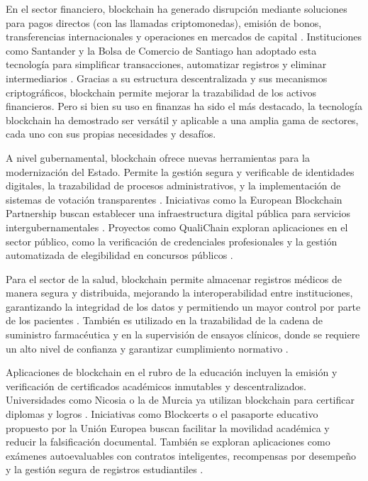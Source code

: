 En el sector financiero, blockchain ha generado disrupción mediante soluciones para pagos directos (con las llamadas criptomonedas), emisión de bonos, transferencias internacionales y operaciones en mercados de capital \cite{bartolomeo2020introduccion}. Instituciones como Santander y la Bolsa de Comercio de Santiago han adoptado esta tecnología para simplificar transacciones, automatizar registros y eliminar intermediarios \cite{bartolomeo2020introduccion}. Gracias a su estructura descentralizada y sus mecanismos criptográficos, blockchain permite mejorar la trazabilidad de los activos financieros. Pero si bien su uso en finanzas ha sido el más destacado, la tecnología blockchain ha demostrado ser versátil y aplicable a una amplia gama de sectores, cada uno con sus propias necesidades y desafíos.

A nivel gubernamental, blockchain ofrece nuevas herramientas para la modernización del Estado. Permite la gestión segura y verificable de identidades digitales, la trazabilidad de procesos administrativos, y la implementación de sistemas de votación transparentes \cite{vaigandla2023review}. Iniciativas como la European Blockchain Partnership buscan establecer una infraestructura digital pública para servicios intergubernamentales \cite{diez2023web}. Proyectos como QualiChain exploran aplicaciones en el sector público, como la verificación de credenciales profesionales y la gestión automatizada de elegibilidad en concursos públicos \cite{diez2023web}.

Para el sector de la salud, blockchain permite almacenar registros médicos de manera segura y distribuida, mejorando la interoperabilidad entre instituciones, garantizando la integridad de los datos y permitiendo un mayor control por parte de los pacientes \cite{sunny2022systematic, }. También es utilizado en la trazabilidad de la cadena de suministro farmacéutica y en la supervisión de ensayos clínicos, donde se requiere un alto nivel de confianza y garantizar cumplimiento normativo \cite{vaigandla2023review}.

Aplicaciones de blockchain en el rubro de la educación incluyen la emisión y verificación de certificados académicos inmutables y descentralizados. Universidades como Nicosia o la de Murcia ya utilizan blockchain para certificar diplomas y logros \cite{diez2023web}. Iniciativas como Blockcerts o el pasaporte educativo propuesto por la Unión Europea buscan facilitar la movilidad académica y reducir la falsificación documental. También se exploran aplicaciones como exámenes autoevaluables con contratos inteligentes, recompensas por desempeño y la gestión segura de registros estudiantiles \cite{diez2023web}.

